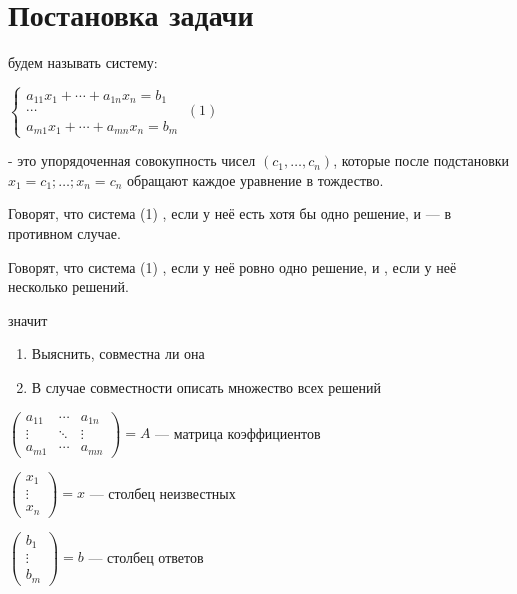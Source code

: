\chapter{Постановка задачи}
\begin{opred}
 будем называть систему:

$\begin{cases}
a_{11}x_1+\cdots+a_{1n}x_n=b_1 \\
\cdots \\
a_{m1}x_1+\cdots+a_{mn}x_n=b_m
\end{cases}\ (1)$
\end{opred}
\begin{opred}
 - это упорядоченная совокупность чисел $(c_1,\ldots,c_n)$, которые после подстановки $x_1=c_1;\ldots;x_n=c_n$ обращают каждое уравнение в тождество.
\end{opred}
\begin{opred}
Говорят, что система (1) , если у неё есть хотя бы одно решение, и  --- в противном случае.
\end{opred}
\begin{opred}
Говорят, что система (1) , если у неё ровно одно решение, и , если у неё несколько решений.
\end{opred}
\begin{opred}
 значит
\begin{enumerate}
\item Выяснить, совместна ли она
\item В случае совместности описать множество всех решений
\end{enumerate}
\end{opred}
$\begin{pmatrix}
a_{11} & \cdots & a_{1n} \\
\vdots & \ddots & \vdots \\
a_{m1} & \cdots & a_{mn}
\end{pmatrix}=A$ --- матрица коэффициентов

$\begin{pmatrix}
x_1    \\
\vdots \\
x_n
\end{pmatrix}=x$ --- столбец неизвестных

$\begin{pmatrix}
b_1    \\
\vdots \\
b_m
\end{pmatrix}=b$ --- столбец ответов

